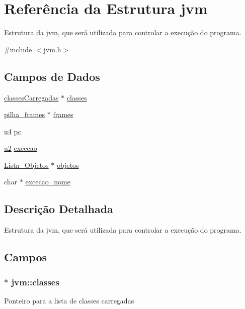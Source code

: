 \hypertarget{structjvm}{}\section{Referência da Estrutura jvm}
\label{structjvm}


Estrutura da jvm, que será utilizada para controlar a execução do programa.  




{\ttfamily \#include $<$jvm.\+h$>$}

\subsection*{Campos de Dados}
\begin{DoxyCompactItemize}
\item 
\hyperlink{structclassesCarregadas}{classes\+Carregadas} $\ast$ \hyperlink{structjvm_a43783d4b1817816cccc62a08154190f6}{classes}
\item 
\hyperlink{structpilha__frames}{pilha\+\_\+frames} $\ast$ \hyperlink{structjvm_a4277814c8cb94f0e77f09428d3d668b9}{frames}
\item 
\hyperlink{lista__operandos_8h_ae5be1f726785414dd1b77d60df074c9d}{u4} \hyperlink{structjvm_ac879eb42576afb2256646f478a7f68c2}{pc}
\item 
\hyperlink{lista__operandos_8h_a732cde1300aafb73b0ea6c2558a7a54f}{u2} \hyperlink{structjvm_a9a1827338d5d118644ec0a72a76a5d89}{excecao}
\item 
\hyperlink{jvm_8h_a44d196f61b6d8bad019106cbc5da18d0}{Lista\+\_\+\+Objetos} $\ast$ \hyperlink{structjvm_a4a51ef7b7c771d7f86a22b4d869ac430}{objetos}
\item 
char $\ast$ \hyperlink{structjvm_a471ac752db9424623227c661b194399b}{excecao\+\_\+nome}
\end{DoxyCompactItemize}


\subsection{Descrição Detalhada}
Estrutura da jvm, que será utilizada para controlar a execução do programa. 

\subsection{Campos}
\subsubsection[{\texorpdfstring{classes}{classes}}]{$\ast$ jvm\+::classes}\hypertarget{structjvm_a43783d4b1817816cccc62a08154190f6}{}\label{structjvm_a43783d4b1817816cccc62a08154190f6}
Ponteiro para a lista de classes carregadas 
